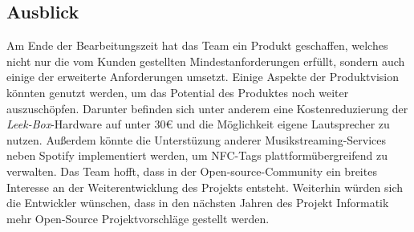 \documentclass[10pt, a4paper]{article}
\begin{document}
\begin{onehalfspace}
\subsection{Ausblick}
Am Ende der Bearbeitungszeit hat das Team ein Produkt geschaffen, welches nicht nur die vom Kunden gestellten Mindestanforderungen erfüllt, sondern auch einige der erweiterte Anforderungen umsetzt.
Einige Aspekte der Produktvision könnten genutzt werden, um das Potential des Produktes noch weiter auszuschöpfen.
Darunter befinden sich unter anderem eine Kostenreduzierung der \textit{Leek-Box}-Hardware auf unter 30€ und die Möglichkeit eigene Lautsprecher zu nutzen.
Außerdem könnte die Unterstüzung anderer Musikstreaming-Services neben Spotify implementiert werden, um NFC-Tags plattformübergreifend zu verwalten.
Das Team hofft, dass in der Open-source-Community ein breites Interesse an der Weiterentwicklung des Projekts entsteht.
Weiterhin würden sich die Entwickler wünschen, dass in den nächsten Jahren des \glqq Projekt Informatik \grqq{} mehr Open-Source Projektvorschläge gestellt werden.


\end{onehalfspace}
\end{document}
